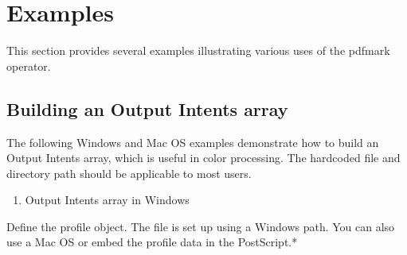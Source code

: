 \documentclass[letterpaper,12pt,english,openany,oneside]{sphinxmanual}
\begin{document}
\chapter{Examples}
\label{\detokenize{pdfmark_Examples:examples}}\label{\detokenize{pdfmark_Examples::doc}}
This section provides several examples illustrating various uses of the pdfmark operator.


\section{Building an Output Intents array}
\label{\detokenize{pdfmark_Examples:building-an-output-intents-array}}
The following Windows and Mac OS examples demonstrate how to build an Output Intents array, which is useful in color processing. The hard\sphinxhyphen{}coded file and directory path should be applicable to most users.
\begin{enumerate}
%
\item {} 
Output Intents array in Windows

\end{enumerate}

Define the profile object. The file is set up using a Windows path. You can also use a Mac OS or embed the profile data in the PostScript.*
\end{document}
